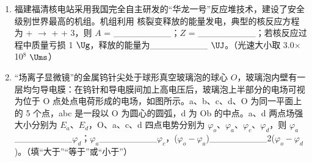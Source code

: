 \documentclass[\gkver]{gaokaozhenti}
\begin{document}
\begin{enumerate}
{再根据选项 AB 分析可知

$Mr_{1}=mr_{2},\ r_{1}+r_{2}=R,$

 $\omega=\left[\frac{G(M+m)}{R^{3}}\right]^{\frac{1}{2}}$

联立解得  $r=\sqrt[3]{\frac{m}{3M+m}}R$

故 C 错误、故 D 正确。

故选 BD。
}

\item
福建福清核电站采用我国完全自主研发的“华龙一号”反应堆技术，建设了安全级别世界最高的机组。机组利用  核裂变释放的能量发电，典型的核反应方程为 + $\to$  +  + 3，则 $A$ = \_\_\_\_\_\_\_\_\_；$Z$ = \_\_\_\_\_\_\_\_\_；若核反应过程中质量亏损 1 $\Ug$，释放的能量为\_\_\_\_\_\_\_\_\_ $\UJ$。（光速大小取 3.0$\times$10$^{8}$ $\Ums$）

\item
“场离子显微镜”的金属钨针尖处于球形真空玻璃泡的球心 $O$，玻璃泡内壁有一层均匀导电膜：在钨针和导电膜间加上高电压后，玻璃泡上半部分的电场可视为位于 O 点处点电荷形成的电场，如图所示。a、b、c、d、O 为同一平面上的 5 个点，abc 是一段以 O 为圆心的圆弧，d 为 Ob 的中点。a、d 两点场强大小分别为 $E_{a}$、$E_{d}$，O、a、c、d 四点电势分别为 $\varphi_{o}$、$\varphi_{a}$、$\varphi_{c}$、$\varphi_{d}$，则 $\varphi_{a}$\_\_\_\_\_\_\_\_\_$\varphi_{d}$；$\varphi_{a}$\_\_\_\_\_\_\_\_\_$\varphi_{c}$，($\varphi_{o} - \varphi_{a}$)\_\_\_\_\_\_\_\_\_2($\varphi_{o} - \varphi_{d}$)。（填“大于”“等于”或“小于”）
\end{enumerate}
\end{document}
